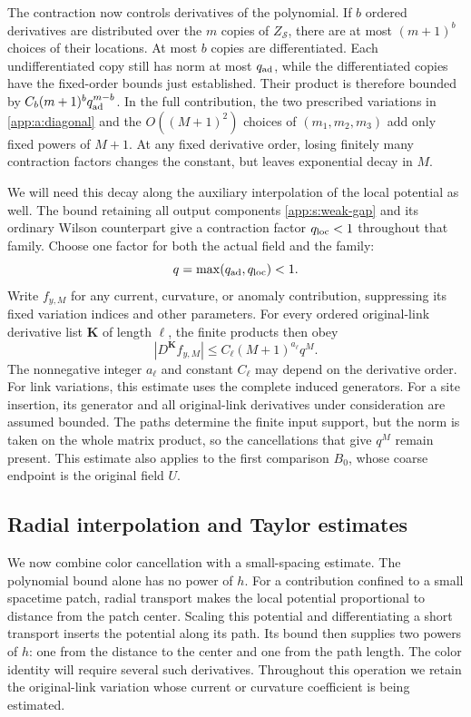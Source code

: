 \documentclass[11pt,a4paper]{article}
\theoremstyle{remark}
\begin{document}
The contraction now controls derivatives of the polynomial. If $b$
ordered derivatives are distributed over the $m$ copies of
$Z_{\mathcal S}$, there are at most $(m+1)^b$ choices of their
locations. At most $b$ copies are differentiated. Each undifferentiated
copy still has norm at most $q_{\rm ad}$, while the differentiated
copies have the fixed-order bounds just established. Their product is
therefore bounded by $C_b(m+1)^bq_{\rm ad}^{m-b}$. In the full
contribution, the two prescribed variations in
\eqref{app:a:diagonal} and the $O((M+1)^2)$ choices of
$(m_1,m_2,m_3)$ add only fixed powers of $M+1$. At any fixed
derivative order, losing finitely many contraction factors changes
the constant, but leaves exponential decay in $M$.

We will need this decay along the auxiliary interpolation of the local
potential as well. The bound retaining all output components \eqref{app:s:weak-gap} and
its ordinary Wilson counterpart give a contraction factor
$q_{\rm loc}<1$ throughout that family. Choose one factor for both
the actual field and the family:
\begin{equation}
 q=\max(q_{\rm ad},q_{\rm loc})<1.
 \label{app:a:common-q}
\end{equation}
Write $f_{y,M}$ for any current, curvature, or anomaly contribution,
suppressing its fixed variation indices and other parameters. For every
ordered original-link derivative list $\boldsymbol K$ of length
$\ell$, the finite products then obey
\begin{equation}
 |D^{\boldsymbol K}f_{y,M}|
       \le C_\ell(M+1)^{a_\ell}q^M.
 \label{app:a:polynomial-bound}
\end{equation}
The nonnegative integer $a_\ell$ and constant $C_\ell$ may depend
on the derivative order. For link variations, this estimate uses the
complete induced generators. For a site insertion, its generator and
all original-link derivatives under consideration are assumed bounded.
The paths determine the finite input support, but the norm is taken on
the whole matrix product, so the cancellations that give $q^M$ remain
present. This estimate also applies to the first comparison $B_0$,
whose coarse endpoint is the original field $U$.

\subsection{Radial interpolation and Taylor estimates}

We now combine color cancellation with a small-spacing estimate. The
polynomial bound alone has no power of $h$. For a contribution confined
to a small spacetime patch, radial transport makes the local potential
proportional to distance from the patch center. Scaling this potential
and differentiating a short transport inserts the potential along its
path. Its bound then supplies two powers of $h$: one from the distance
to the center and one from the path length. The color identity will
require several such derivatives.
Throughout this operation we retain the original-link variation whose
current or curvature coefficient is being estimated.
\end{document}
